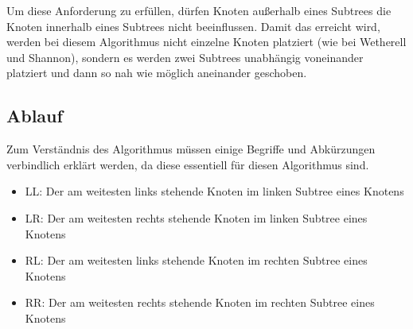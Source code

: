 Um diese Anforderung zu erfüllen, dürfen Knoten außerhalb eines Subtrees die Knoten innerhalb eines Subtrees nicht beeinflussen. 
Damit das erreicht wird, werden bei diesem Algorithmus nicht einzelne Knoten platziert (wie bei Wetherell und Shannon), 
sondern es werden zwei Subtrees unabhängig voneinander platziert und dann so nah wie möglich aneinander geschoben. 

\label{chap:kapitel3_3_Ablauf}
\subsection{Ablauf}
Zum Verständnis des Algorithmus müssen einige Begriffe und Abkürzungen verbindlich erklärt werden, 
da diese essentiell für diesen Algorithmus sind.
\begin{itemize}
    \item LL: Der am weitesten links stehende Knoten im linken Subtree eines Knotens
    \item LR: Der am weitesten rechts stehende Knoten im linken Subtree eines Knotens
    \item RL: Der am weitesten links stehende Knoten im rechten Subtree eines Knotens
    \item RR: Der am weitesten rechts stehende Knoten im rechten Subtree eines Knotens
\end{itemize} 


